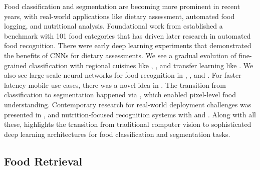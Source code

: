 \documentclass{article}
\begin{document}
Food classification and segmentation are becoming more prominent in recent years, with real-world applications like dietary assessment, automated food logging, and nutritional analysis. Foundational work from \cite{Bossard2014} established a benchmark with 101 food categories that has driven later research in automated food recognition. There were early deep learning experiments \cite{arxiv.1606.05675} that demonstrated the benefits of CNNs for dietary assessments. We see a gradual evolution of fine-grained classification with regional cuisines like \cite{arxiv.1705.02743}, \cite{arxiv.1907.06167}, and transfer learning like \cite{Lee2018}. We also see large-scale neural networks for food recognition in \cite{Min2020}, \cite{Min2023}, and \cite{Liu2024}. For faster latency mobile use cases, there was a novel idea in \cite{Termritthikun2017}. The transition from classification to segmentation happened via \cite{Wu2021}, which enabled pixel-level food understanding. Contemporary research for real-world deployment challenges was presented in \cite{Liu2024}, and nutrition-focused recognition systems with \cite{Doyen2019} and \cite{RomeroTapiador2024}. Along with all these, \cite{Liu2025} highlights the transition from traditional computer vision to sophisticated deep learning architectures for food classification and segmentation tasks. 

\subsection{Food Retrieval}
\label{subsec:related-retrieval}
\end{document}
